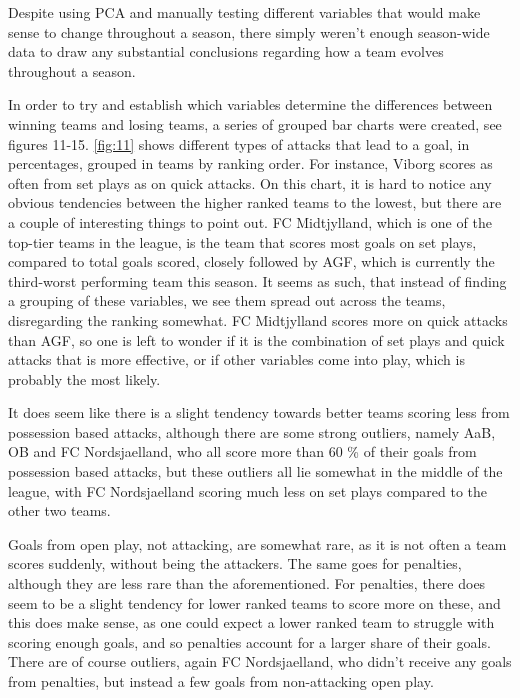 \documentclass[Report.tex]{subfiles}
\begin{document}
Despite using PCA and manually testing different variables that would make sense to change throughout a season, there simply weren't enough season-wide data to draw any substantial conclusions regarding how a team evolves throughout a season.

In order to try and establish which variables determine the differences between
winning teams and losing teams, a series of grouped bar charts were created, see
figures 11-15. \ref{fig:11} shows different types of attacks that lead to a goal,
in percentages, grouped in teams by ranking order. For instance, Viborg scores
as often from set plays as on quick attacks.
On this chart, it is hard to notice any obvious tendencies between the higher
ranked teams to the lowest, but there are a couple of interesting things to
point out. FC Midtjylland, which is one of the top-tier teams in the league, is
the team that scores most goals on set plays, compared to total goals scored,
closely followed by AGF, which is currently the third-worst performing team
this season. It seems as such, that instead of finding a grouping of these
variables, we see them spread out across the teams, disregarding the ranking
somewhat. FC Midtjylland scores more on quick attacks than AGF, so one is left
to wonder if it is the combination of set plays and quick attacks that is more
effective, or if other variables come into play, which is probably the most
likely. 

It does seem like there is a slight tendency towards better teams scoring less
from possession based attacks, although there are some strong outliers, namely
AaB, OB and FC Nordsjaelland, who all score more than 60 \% of their
goals from possession based attacks, but these outliers all lie somewhat in the
middle of the league, with FC Nordsjaelland scoring much less on set plays
compared to the other two teams. 

Goals from open play, not attacking, are somewhat rare, as it is not often a
team scores suddenly, without being the attackers. The same goes for penalties,
although they are less rare than the aforementioned. For penalties, there does
seem to be a slight tendency for lower ranked teams to score more on these, and
this does make sense, as one could expect a lower ranked team to struggle with
scoring enough goals, and so penalties account for a larger share of their
goals. There are of course outliers, again FC Nordsjaelland, who didn't receive
any goals from penalties, but instead a few goals from non-attacking open play. 
\end{document}
